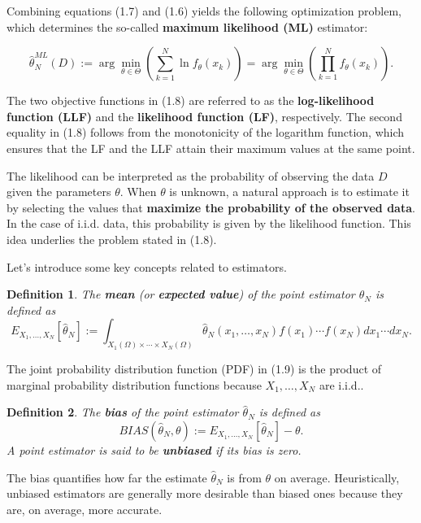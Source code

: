 \documentclass{report}
\newtheorem{definition}{Definition}[chapter]
\begin{document}
Combining equations (1.7) and (1.6) yields the following optimization problem, which determines the so-called \textbf{maximum likelihood (ML)} estimator:

\begin{equation}
\hat{\theta}^{ML}_N(D) := \arg\min_{\theta \in \Theta}\left(\sum_{k=1}^N\ln f_\theta(x_k)  \right) = \arg\min_{\theta \in \Theta}\left(\prod_{k=1}^N f_\theta(x_k) \right).
\end{equation}

The two objective functions in (1.8) are referred to as the \textbf{log-likelihood function (LLF)} and the \textbf{likelihood function (LF)}, respectively.
The second equality in (1.8) follows from the monotonicity of the logarithm function, which ensures that the LF and the LLF attain their maximum values at the same point.

The likelihood can be interpreted as the probability of observing the data $D$ given the parameters $\theta$. When $\theta$ is unknown, a natural approach is to estimate it by selecting the values that \textbf{maximize the probability of the observed data}. In the case of i.i.d. data, this probability is given by the likelihood function. This idea underlies the problem stated in (1.8).

Let’s introduce some key concepts related to estimators.
\begin{definition}
The \textbf{mean} (or \textbf{expected value}) of the point estimator $\hat{\theta}_N$ is defined as
\begin{equation}
E_{X_1,\dots,X_N}[\hat{\theta}_N] := \int_{X_1(\Omega)\times \cdots \times X_N(\Omega)} \hat{\theta}_N(x_1,\dots,x_N)f(x_1)\cdots f(x_N) dx_1\cdots dx_N.
\end{equation}
\end{definition}

The joint probability distribution function (PDF) in (1.9) is the product of marginal probability distribution functions because $X_1,\dots,X_N$ are i.i.d..

\begin{definition}
The \textbf{bias} of the point estimator $\hat{\theta}_N$ is defined as
\begin{equation}
BIAS(\hat{\theta}_N,\theta) := E_{X_1,\dots,X_N}[\hat{\theta}_N] - \theta.
\end{equation}
A point estimator is said to be \textbf{unbiased} if its bias is zero. 
\end{definition}

The bias quantifies how far the estimate $\hat{\theta}_N$ is from $\theta$ on average. Heuristically, unbiased estimators are generally more desirable than biased ones because they are, on average, more accurate.
\end{document}
